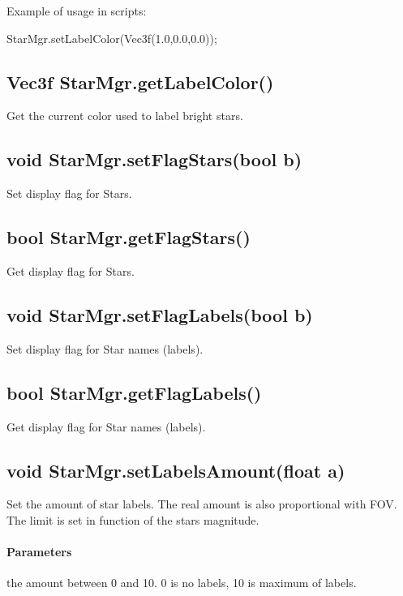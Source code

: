 \noindent Example of usage in scripts:
\begin{script}
StarMgr.setLabelColor(Vec3f(1.0,0.0,0.0));
\end{script}

\subsection{Vec3f StarMgr.getLabelColor()}
\label{sec:ScriptingAPI:StarMgr:getLabelColor}
Get the current color used to label bright stars.

\subsection{void StarMgr.setFlagStars(bool b)}
\label{sec:ScriptingAPI:StarMgr:setFlagStars}
Set display flag for Stars.

\subsection{bool StarMgr.getFlagStars()}
\label{sec:ScriptingAPI:StarMgr:getFlagStars}
Get display flag for Stars.

\subsection{void StarMgr.setFlagLabels(bool b)}
\label{sec:ScriptingAPI:StarMgr:setFlagLabels}
Set display flag for Star names (labels).

\subsection{bool StarMgr.getFlagLabels()}
\label{sec:ScriptingAPI:StarMgr:getFlagLabels}
Get display flag for Star names (labels).

\subsection{void StarMgr.setLabelsAmount(float a)}
\label{sec:ScriptingAPI:StarMgr:setLabelsAmount}
Set the amount of star labels. The real amount is also proportional with FOV. The limit is set in function of the stars magnitude.

\paragraph{Parameters}
\begin{description}[align=right,labelwidth=3cm,leftmargin=3.2cm]
\item[\parameter{a}] the amount between 0 and 10. 0 is no labels, 10 is maximum of labels.
\end{description}

